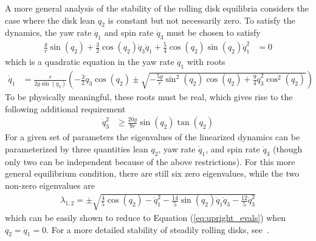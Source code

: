 \documentclass[smallcondensed,final]{svjour3}                     %
\begin{document}
A more general analysis of the stability of the rolling disk equilibria
considers the case where the disk lean $q_2$ is constant but not necessarily
zero. To satisfy the dynamics, the yaw rate $\dot{q}_1$ and spin rate
$\dot{q}_3$ must be chosen to satisfy
\begin{align}
  \frac{g}{r}\sin{(q_2)}  + \frac{3}{2}\cos{(q_2)} \dot{q}_3 \dot{q}_1 +
  \frac{5}{4}\cos{(q_2)}\sin{(q_2)} \dot{q}_1^2
 &= 0
\end{align}
which is a quadratic equation in the yaw rate $\dot{q}_1$ with roots
\begin{align}
\dot{q}_1 &= \frac{r}{2 g \sin\left(q_{2}\right)} \left( - \frac{3}{2} \dot{q}_{3}\cos\left(q_{2}\right) \pm \sqrt{- \frac{5 g}{r} \sin^{2}\left(q_{2}\right) \cos\left(q_{2}\right) + \frac{9}{4} \dot{q}_{3}^{2} \cos^{2}\left(q_{2}\right)} \right)
\end{align}
To be physically meaningful, these roots must be real, which gives rise to the following additional requirement
\begin{align}
  \dot{q}_3^2 &\geq \frac{20g}{9r}\sin{(q_2)} \tan{(q_2)}
\end{align}
For a given set of parameters the eigenvalues of the linearized dynamics can be
parameterized by three quantities lean $q_2$, yaw rate $\dot{q}_1$, and spin
rate $\dot{q}_3$ (though only two can be independent because of the above
restrictions). For this more general equilibrium condition, there are still six
zero eigenvalues, while the two non-zero eigenvalues are
\begin{align}
\lambda_{1,2} = \pm\sqrt{\frac{4}{5} \cos\left(q_{2}\right) - \dot{q}_{1}^{2} -\frac{14}{5} \sin\left(q_{2}\right) \dot{q}_{1} \dot{q}_{3} - \frac{12}{5}\dot{q}_{3}^{2}}
\end{align}
which can be easily shown to reduce to Equation (\ref{eq:upright_evals}) when
$q_2 = \dot{q}_1 = 0$. For a more detailed stability of steadily rolling disks,
see~\cite{O'Reilly1996,Neimark1972,Kuleshov2001}.
\end{document}
